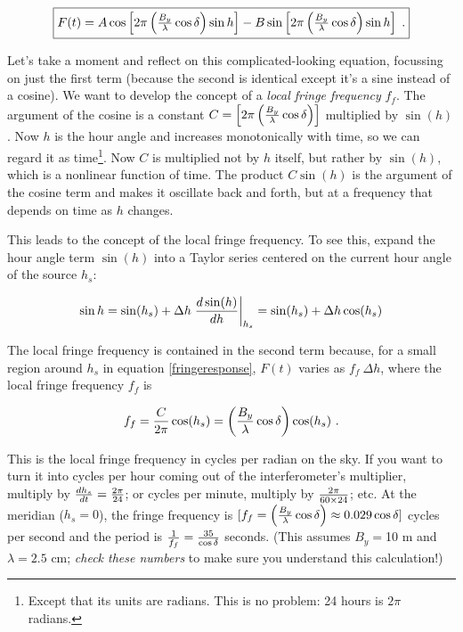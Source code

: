 \documentclass[11pt,preprint]{aastex}
\begin{document}
\begin{equation} \fbox{$
\label{fringeresponse}
 F(t) = A \cos \left[2 \pi \left( {B_y \over \lambda} \cos\delta \right) \sin h\right] 
 - B \sin \left[2 \pi \left( {B_y \over \lambda} \cos\delta \right) \sin h\right] \; . 
$}
\end{equation}

	Let's take a moment and reflect on this complicated-looking
equation, focussing on just the first term (because the second is
identical except it's a sine instead of a cosine). We want to develop
the concept of a {\it local fringe frequency} $f_f$. The argument of the
cosine is a constant $C=\left[2 \pi \left( {B_y \over \lambda}
\cos\delta \right)\right]$ multiplied by $\sin( h)$. Now $h$ is the hour
angle and increases monotonically with time, so we can regard it as
time\footnote{Except that its units are radians. This is no problem: 24
hours is $2\pi$ radians.}. Now $C$ is multiplied not by $h$ itself, but
rather by $\sin( h)$, which is a nonlinear function of time. The product
$C \sin(h)$ is the argument of the cosine term and makes it oscillate
back and forth, but at a frequency that depends on time as $h$ changes. 

	This leads to the concept of the local fringe frequency. To see
this, expand the hour angle term $\sin (h)$ into a Taylor series
centered on the current hour angle of the source $h_s$:

\begin{equation} \label{taylorexpansion}
\sin h = \sin( h_s) + 
  \Delta h \left. {d \sin(h) \over dh}\right|_{h_s} = 
\sin( h_s) + \Delta h \cos( h_s) 
\end{equation}

\noindent The local fringe frequency is contained in the second term
because, for a small region around $h_s$ in equation
\ref{fringeresponse}, $F(t)$ varies as $f_f \ \Delta h$, where  the
local fringe frequency $f_f$ is

\begin{equation} \label{fringefreq}
f_f = {C \over 2\pi}  \cos(h_s) = \left( {B_y \over \lambda} \cos\delta
\right) \cos( h_s) \ .
\end{equation}

\noindent This is the local fringe frequency in cycles per radian on the
sky. If you want to turn it into cycles per hour coming out of the
interferometer's multiplier, multiply by ${dh_s \over dt} = {2\pi \over
24}$; or cycles per minute, multiply by $2\pi \over 60 \times 24$;
etc. At the meridian ($h_s=0$), the fringe frequency is $[f_f =
\left({B_y \over \lambda} \cos{\delta} \right) \approx 0.029 \cos
\delta]$ cycles per second and the period is ${1 \over f_f} = {35 \over
\cos \delta}$ seconds. (This assumes $B_y=$10 m and $\lambda=2.5$ cm;
{\it check these numbers} to make sure you understand this calculation!)
\end{document}
